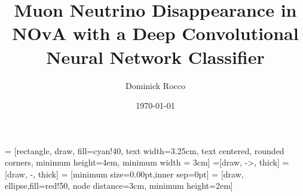 \documentclass[10pt,professionalfonts,xcolor=table]{beamer}
\title[\numu Disappearance CNN]{Muon Neutrino Disappearance in NOvA with a Deep Convolutional Neural Network Classifier}
\author[D. Rocco]{Dominick Rocco}
\date{\today}
\institute{University of Minnesota}
\begin{document}
 = [rectangle, draw, fill=cyan!40,
   text width=3.25cm, text centered, rounded corners, minimum height=4em, minimum width = 3cm]
=[draw, ->, thick]
=[draw, -, thick]
 = [minimum size=0.00pt,inner sep=0pt]
 = [draw, ellipse,fill=red!50, node distance=3cm,
   minimum height=2em]

\frame{\titlepage}


\begin{frame}
\end{frame}
\end{document}
